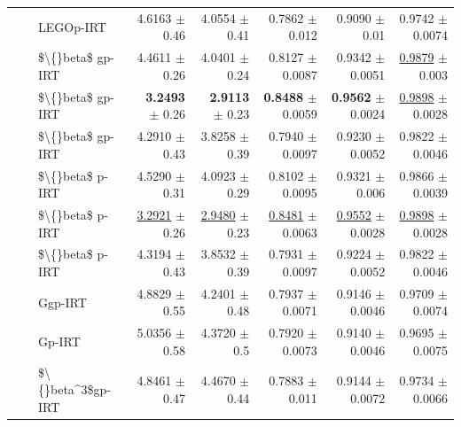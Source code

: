 \begin{longtable}{llp{}rrrrr}
 &  & LEGOp-IRT & 4.6163 {\scriptsize $\pm$ 0.46} & 4.0554 {\scriptsize $\pm$ 0.41} & 0.7862 {\scriptsize $\pm$ 0.012} & 0.9090 {\scriptsize $\pm$ 0.01} & 0.9742 {\scriptsize $\pm$ 0.0074} \\
 &  & \$\textbackslash\{\}beta\$ gp-IRT & 4.4611 {\scriptsize $\pm$ 0.26} & 4.0401 {\scriptsize $\pm$ 0.24} & 0.8127 {\scriptsize $\pm$ 0.0087} & 0.9342 {\scriptsize $\pm$ 0.0051} & \underline{0.9879} {\scriptsize $\pm$ 0.003} \\
 &  & \$\textbackslash\{\}beta\$ gp-IRT & \textbf{3.2493} {\scriptsize $\pm$ 0.26} & \textbf{2.9113} {\scriptsize $\pm$ 0.23} & \textbf{0.8488} {\scriptsize $\pm$ 0.0059} & \textbf{0.9562} {\scriptsize $\pm$ 0.0024} & \underline{0.9898} {\scriptsize $\pm$ 0.0028} \\
 &  & \$\textbackslash\{\}beta\$ gp-IRT & 4.2910 {\scriptsize $\pm$ 0.43} & 3.8258 {\scriptsize $\pm$ 0.39} & 0.7940 {\scriptsize $\pm$ 0.0097} & 0.9230 {\scriptsize $\pm$ 0.0052} & 0.9822 {\scriptsize $\pm$ 0.0046} \\
 &  & \$\textbackslash\{\}beta\$ p-IRT & 4.5290 {\scriptsize $\pm$ 0.31} & 4.0923 {\scriptsize $\pm$ 0.29} & 0.8102 {\scriptsize $\pm$ 0.0095} & 0.9321 {\scriptsize $\pm$ 0.006} & 0.9866 {\scriptsize $\pm$ 0.0039} \\
 &  & \$\textbackslash\{\}beta\$ p-IRT & \underline{3.2921} {\scriptsize $\pm$ 0.26} & \underline{2.9480} {\scriptsize $\pm$ 0.23} & \underline{0.8481} {\scriptsize $\pm$ 0.0063} & \underline{0.9552} {\scriptsize $\pm$ 0.0028} & \underline{0.9898} {\scriptsize $\pm$ 0.0028} \\
 &  & \$\textbackslash\{\}beta\$ p-IRT & 4.3194 {\scriptsize $\pm$ 0.43} & 3.8532 {\scriptsize $\pm$ 0.39} & 0.7931 {\scriptsize $\pm$ 0.0097} & 0.9224 {\scriptsize $\pm$ 0.0052} & 0.9822 {\scriptsize $\pm$ 0.0046} \\
 &  & Ggp-IRT & 4.8829 {\scriptsize $\pm$ 0.55} & 4.2401 {\scriptsize $\pm$ 0.48} & 0.7937 {\scriptsize $\pm$ 0.0071} & 0.9146 {\scriptsize $\pm$ 0.0046} & 0.9709 {\scriptsize $\pm$ 0.0074} \\
 &  & Gp-IRT & 5.0356 {\scriptsize $\pm$ 0.58} & 4.3720 {\scriptsize $\pm$ 0.5} & 0.7920 {\scriptsize $\pm$ 0.0073} & 0.9140 {\scriptsize $\pm$ 0.0046} & 0.9695 {\scriptsize $\pm$ 0.0075} \\
 &  & \$\textbackslash\{\}beta\textasciicircum{}3\$gp-IRT & 4.8461 {\scriptsize $\pm$ 0.47} & 4.4670 {\scriptsize $\pm$ 0.44} & 0.7883 {\scriptsize $\pm$ 0.011} & 0.9144 {\scriptsize $\pm$ 0.0072} & 0.9734 {\scriptsize $\pm$ 0.0066} \\

\end{longtable}
